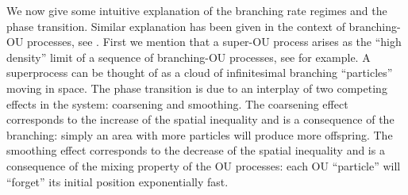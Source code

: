 \documentclass[EJP]{ejpecp} %
\begin{document}
 We now give some intuitive explanation of the branching rate regimes and the  phase transition.
Similar explanation has been given in the context of branching-OU processes, see \cite{MarksMilos2018CLT}.
First we mention that a super-OU process arises as the ``high density'' limit of a sequence of branching-OU processes, see \cite{Li2011Measure-valued} for example. A superprocess can be thought of as a cloud of infinitesimal branching ``particles'' moving in space.
The phase transition is due to an interplay of two competing effects in the system: coarsening and smoothing.
The coarsening effect corresponds to the increase of the spatial inequality and is a consequence of the branching: simply an area with more particles will produce more offspring.
The smoothing effect corresponds to the decrease of the spatial inequality and is a consequence of the mixing property of the OU processes: each OU ``particle'' will ``forget'' its initial position exponentially fast.
\end{document}
